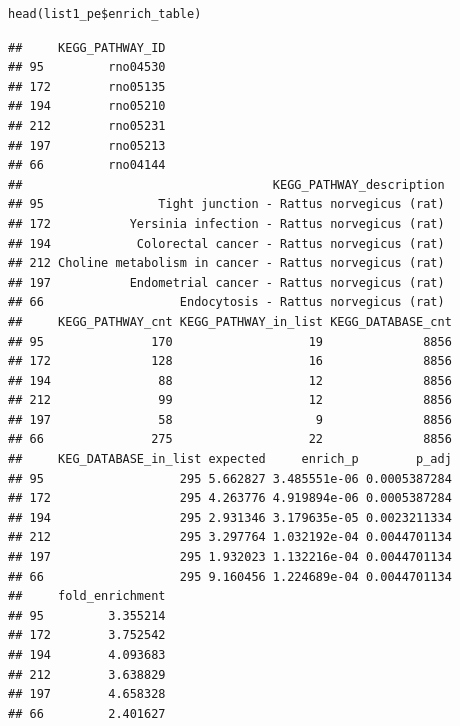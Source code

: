 \documentclass[article]{jss}\usepackage[]{graphicx}\usepackage[]{color}
\makeatletter
\newenvironment{kframe}{%
 \def\at@end@of@kframe{}%
 \ifinner\ifhmode%
  \def\at@end@of@kframe{\end{minipage}}%
  \begin{minipage}{\columnwidth}%
 \fi\fi%
 \def\FrameCommand##1{\hskip\@totalleftmargin \hskip-\fboxsep
 \colorbox{shadecolor}{##1}\hskip-\fboxsep
     \hskip-\linewidth \hskip-\@totalleftmargin \hskip\columnwidth}%
 \MakeFramed {\advance\hsize-\width
   \@totalleftmargin\z@ \linewidth\hsize
   \@setminipage}}%
 {\par\unskip\endMakeFramed%
 \at@end@of@kframe}
\newenvironment{knitrout}{}{} %
\makeatother
\begin{document}
\begin{knitrout}
\color{fgcolor}\begin{kframe}
\begin{lstlisting}[basicstyle=\ttfamily,breaklines=true]
head(list1_pe$enrich_table)\end{lstlisting}
\begin{lstlisting}[basicstyle=\ttfamily,breaklines=true]
##     KEGG_PATHWAY_ID
## 95         rno04530
## 172        rno05135
## 194        rno05210
## 212        rno05231
## 197        rno05213
## 66         rno04144
##                                   KEGG_PATHWAY_description
## 95                Tight junction - Rattus norvegicus (rat)
## 172           Yersinia infection - Rattus norvegicus (rat)
## 194            Colorectal cancer - Rattus norvegicus (rat)
## 212 Choline metabolism in cancer - Rattus norvegicus (rat)
## 197           Endometrial cancer - Rattus norvegicus (rat)
## 66                   Endocytosis - Rattus norvegicus (rat)
##     KEGG_PATHWAY_cnt KEGG_PATHWAY_in_list KEGG_DATABASE_cnt
## 95               170                   19              8856
## 172              128                   16              8856
## 194               88                   12              8856
## 212               99                   12              8856
## 197               58                    9              8856
## 66               275                   22              8856
##     KEG_DATABASE_in_list expected     enrich_p        p_adj
## 95                   295 5.662827 3.485551e-06 0.0005387284
## 172                  295 4.263776 4.919894e-06 0.0005387284
## 194                  295 2.931346 3.179635e-05 0.0023211334
## 212                  295 3.297764 1.032192e-04 0.0044701134
## 197                  295 1.932023 1.132216e-04 0.0044701134
## 66                   295 9.160456 1.224689e-04 0.0044701134
##     fold_enrichment
## 95         3.355214
## 172        3.752542
## 194        4.093683
## 212        3.638829
## 197        4.658328
## 66         2.401627
\end{lstlisting}
\end{kframe}
\end{knitrout}
\end{document}
